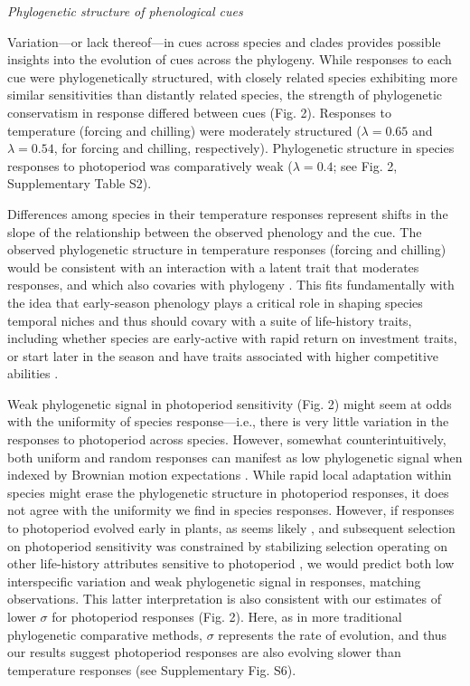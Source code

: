 \documentclass[11pt]{article}
\begin{document}
\emph{Phylogenetic structure of phenological cues}

\par Variation---or lack thereof---in cues across species and clades provides possible insights into the evolution of cues across the phylogeny. While responses to each cue were phylogenetically structured, with closely related species exhibiting more similar sensitivities than distantly related species, the strength of phylogenetic conservatism in response differed between cues (Fig. 2). Responses to temperature (forcing and chilling) were moderately structured ($\lambda = 0.65$ and $\lambda = 0.54$, for forcing and chilling, respectively). Phylogenetic structure in species responses to photoperiod was comparatively weak ($\lambda= 0.4$; see Fig. 2, Supplementary Table S2).

\par Differences among species in their temperature responses represent shifts in the slope of the relationship between the observed phenology and the cue. The observed phylogenetic structure in temperature responses (forcing and chilling) would be consistent with an interaction with a latent trait that moderates responses, and which also covaries with phylogeny \citep{davies2019phylogenetically}. This fits fundamentally with the idea that early-season phenology plays a critical role in shaping species temporal niches \citep{gotelli1996} and thus should covary with a suite of life-history traits, including whether species are early-active with rapid return on investment traits, or start later in the season and have traits associated with higher competitive abilities \citep[e.g.,][]{Grime:1977sw,memegan2021}.

\par Weak phylogenetic signal in photoperiod sensitivity (Fig. 2) might seem at odds with the uniformity of species response---i.e., there is very little variation in the responses to photoperiod across species. However, somewhat counterintuitively, both uniform and random responses can manifest as low phylogenetic signal when indexed by Brownian motion expectations \citep{wiens2010niche}. While rapid local adaptation within species might erase the phylogenetic structure in photoperiod responses, it does not agree with the uniformity we find in species responses. However, if responses to photoperiod evolved early in plants, as seems likely \citep{serrano2017}, and subsequent selection on photoperiod sensitivity was constrained by stabilizing selection operating on other life-history attributes sensitive to photoperiod \citep[e.g.,][]{Rinne:1994,Wilczek2014,azeez2015}, we would predict both low interspecific variation and weak phylogenetic signal in responses, matching observations. This latter interpretation is also consistent with our estimates of lower $\sigma$ for photoperiod responses (Fig. 2). Here, as in more traditional phylogenetic comparative methods, $\sigma$ represents the rate of evolution, and thus our results suggest photoperiod responses are also evolving slower than temperature responses (see Supplementary Fig. S6).
\end{document}
